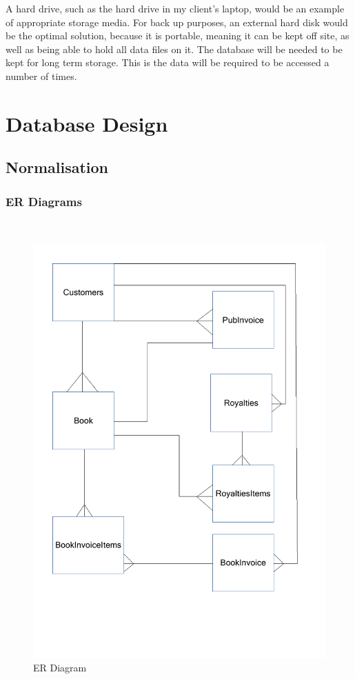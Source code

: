 A hard drive, such as the hard drive in my client's laptop, would be an example of appropriate storage media. For back up purposes, an external hard disk would be the optimal solution, because it is portable, meaning it can be kept off site, as well as being able to hold all data files on it. The database will be needed to be kept for long term storage. This is the data will be required to be accessed a number of times.

\section{Database Design}

\subsection{Normalisation}
 
\subsubsection{ER Diagrams}

\

\begin{figure}[H]
    \caption{ER Diagram} \label{ER_Diagram.pdf}
    \includegraphics[width=\textwidth]{./Design/ER_Diagram.pdf}
\end{figure}

